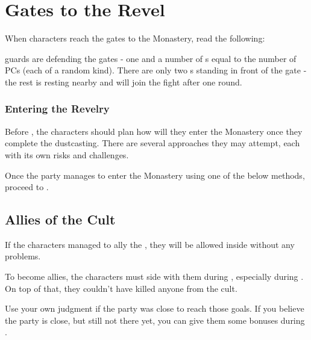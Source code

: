 \section{Gates to the Revel}
\label{sec:revelryGates}

When characters reach the gates to the Monastery, read the following:


\npcFractionCult{} guards are defending the gates - one \enemyRevelerMasked{} and a number of \enemyCultist{}s equal to the number of PCs (each \enemyCultistOfMoments{} of a random kind). There are only two \enemyCultist{}s standing in front of the gate - the rest is resting nearby and will join the fight after one round.


\subsubsection{Entering the Revelry}
\label{sec:cityEscapePlan}

Before , the characters should plan how will they enter the Monastery once they complete the dustcasting. There are several approaches they may attempt, each with its own risks and challenges.

Once the party manages to enter the Monastery using one of the below methods, proceed to .



\subsection{Allies of the Cult}

If the characters managed to ally the \npcFractionCult{}, they will be allowed inside without any problems.

To become allies, the characters must side with them during , especially during . On top of that, they couldn't have killed anyone from the cult. 

Use your own judgment if the party was close to reach those goals. If you believe the party is close, but still not there yet, you can give them some bonuses during .




